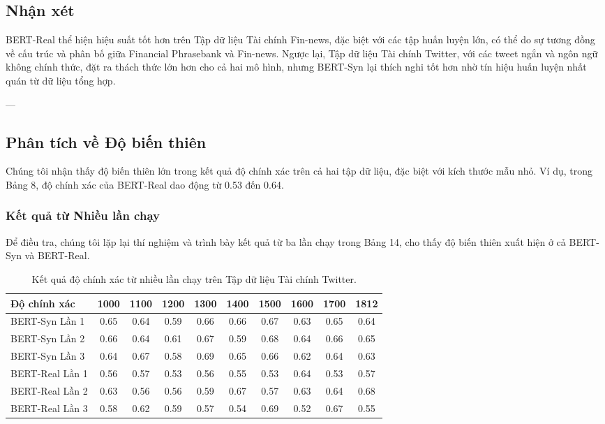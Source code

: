 \documentclass[a4paper,10pt]{article}
\begin{document}
\subsection{Nhận xét} 

BERT-Real thể hiện hiệu suất tốt hơn trên Tập dữ liệu Tài chính Fin-news, đặc biệt với các tập huấn luyện lớn, có thể do sự tương đồng về cấu trúc và phân bố giữa Financial Phrasebank và Fin-news. Ngược lại, Tập dữ liệu Tài chính Twitter, với các tweet ngắn và ngôn ngữ không chính thức, đặt ra thách thức lớn hơn cho cả hai mô hình, nhưng BERT-Syn lại thích nghi tốt hơn nhờ tín hiệu huấn luyện nhất quán từ dữ liệu tổng hợp.

---

\subsection{Phân tích về Độ biến thiên} 
Chúng tôi nhận thấy độ biến thiên lớn trong kết quả độ chính xác trên cả hai tập dữ liệu, đặc biệt với kích thước mẫu nhỏ. Ví dụ, trong Bảng 8, độ chính xác của BERT-Real dao động từ 0.53 đến 0.64.

\subsubsection{Kết quả từ Nhiều lần chạy
} 
Để điều tra, chúng tôi lặp lại thí nghiệm và trình bày kết quả từ ba lần chạy trong Bảng 14, cho thấy độ biến thiên xuất hiện ở cả BERT-Syn và BERT-Real.

\begin{table}[h]
    \renewcommand{\thetable}{14}
    \centering
    \caption{Kết quả độ chính xác từ nhiều lần chạy trên Tập dữ liệu Tài chính Twitter.}
    \label{tab:accuracy_twitter}
    \begin{tabular}{lccccccccc}
        \hline
        Độ chính xác & 1000 & 1100 & 1200 & 1300 & 1400 & 1500 & 1600 & 1700 & 1812 \\
        \hline
        BERT-Syn Lần 1  & 0.65 & 0.64 & 0.59 & 0.66 & 0.66 & 0.67 & 0.63 & 0.65 & 0.64 \\
        BERT-Syn Lần 2  & 0.66 & 0.64 & 0.61 & 0.67 & 0.59 & 0.68 & 0.64 & 0.66 & 0.65 \\
        BERT-Syn Lần 3  & 0.64 & 0.67 & 0.58 & 0.69 & 0.65 & 0.66 & 0.62 & 0.64 & 0.63 \\
        BERT-Real Lần 1 & 0.56 & 0.57 & 0.53 & 0.56 & 0.55 & 0.53 & 0.64 & 0.53 & 0.57 \\
        BERT-Real Lần 2 & 0.63 & 0.56 & 0.56 & 0.59 & 0.67 & 0.57 & 0.63 & 0.64 & 0.68 \\
        BERT-Real Lần 3 & 0.58 & 0.62 & 0.59 & 0.57 & 0.54 & 0.69 & 0.52 & 0.67 & 0.55 \\
        \hline
    \end{tabular}
\end{table}
\end{document}
